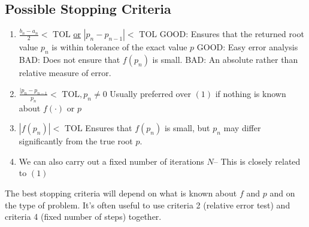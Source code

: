 \subsection{Possible Stopping Criteria}

\begin{enumerate}
  \item $\displaystyle \frac{b_n-a_n}{2} < \text{ TOL}$ \quad\uline{or} \quad
    $\displaystyle \left| p_n - p_{n-1} \right| < \text{ TOL}$
    \subitem GOOD: Ensures that the returned root value $p_n$ is within 
    tolerance of the exact value $p$
    \subitem GOOD: Easy error analysis
    \subitem BAD: Does not ensure that $f(p_n)$ is small.
    \subitem BAD: An absolute rather than relative measure of error.
  \item $\displaystyle \frac{|p_n - p_{n-1}}{p_n} < \text{ TOL}, p_n \neq 0$
    \subitem Usually preferred over $(1)$ if nothing is known about $f(\cdot)$ or
    $p$
  \item $\left| f(p_n) \right| < \text{ TOL}$
    \subitem Ensures that $f(p_n)$ is small, but $p_n$ may differ significantly
    from the true root $p$.
  \item We can also carry out a fixed number of iterations $N$-- This is closely
    related to $(1)$
\end{enumerate}

The best stopping criteria will depend on what is known about $f$ and $p$ and
on the type of problem. It's often useful to use criteria 2 (relative error test)
and criteria 4 (fixed number of steps) together.

